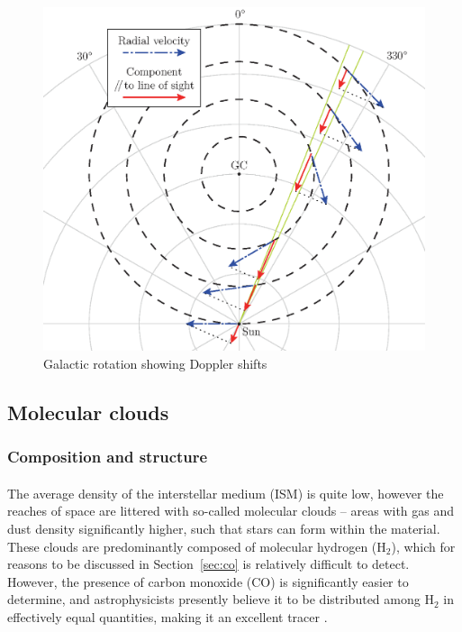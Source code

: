 \documentclass[a4paper, titlepage, oneside]{article}
\newcommand{\molec}[2]{\ensuremath{\text{#1}_{#2}}}
\begin{document}
\begin{multicols}{2}
\begin{figure}[H]
  \centering
  \includegraphics[width = \columnwidth]{figures/galactic-rotation}
  \caption{Galactic rotation showing Doppler shifts}
  \label{fig:gal-rot}
\end{figure}

\subsection{Molecular clouds}
\subsubsection{Composition and structure}
\paragraph{}
The average density of the interstellar medium (ISM) is quite low, however the reaches of space are littered with so-called molecular clouds -- areas with gas and dust density significantly higher, such that stars can form within the material. These clouds are predominantly composed of molecular hydrogen (\molec{H}{2}), which for reasons to be discussed in Section~\ref{sec:co} is relatively difficult to detect. However, the presence of carbon monoxide (CO) is significantly easier to determine, and astrophysicists presently believe it to be distributed among \molec{H}{2} in effectively equal quantities, making it an excellent tracer \parencite{Glover:2011}.


\end{multicols}
\end{document}
